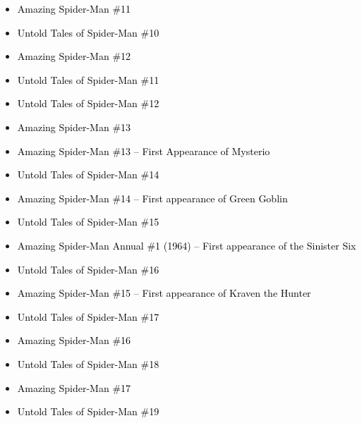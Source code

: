 \documentclass[12pt]{article}
\begin{document}
\begin{minipage}{\textwidth}
\begin{center}
    \begin{tcolorbox}[colback=white!95!gray, colframe=black, width=0.85\textwidth, boxrule=0.5mm, sharp corners=south]
    \begin{itemize}[left=0pt, label={$\square$}]
        \item \textcolor{black}{Amazing Spider-Man \#11}
        \item \textcolor{black}{Untold Tales of Spider-Man \#10}
        \item \textcolor{black}{Amazing Spider-Man \#12}
        \item \textcolor{black}{Untold Tales of Spider-Man \#11}
        \item \textcolor{black}{Untold Tales of Spider-Man \#12}
        \item \textcolor{black}{Amazing Spider-Man \#13}
        \item \textcolor{black}{Amazing Spider-Man \#13 – First Appearance of Mysterio}
        \item \textcolor{black}{Untold Tales of Spider-Man \#14}
        \item \textcolor{black}{Amazing Spider-Man \#14 – First appearance of Green Goblin}
        \item \textcolor{black}{Untold Tales of Spider-Man \#15}
        \item \textcolor{black}{Amazing Spider-Man Annual \#1 (1964) – First appearance of the Sinister Six}
        \item \textcolor{black}{Untold Tales of Spider-Man \#16}
        \item \textcolor{black}{Amazing Spider-Man \#15 – First appearance of Kraven the Hunter}
        \item \textcolor{black}{Untold Tales of Spider-Man \#17}
        \item \textcolor{black}{Amazing Spider-Man \#16}
        \item \textcolor{black}{Untold Tales of Spider-Man \#18}
        \item \textcolor{black}{Amazing Spider-Man \#17}
        \item \textcolor{black}{Untold Tales of Spider-Man \#19}
    \end{itemize}
    \end{tcolorbox}
\end{center}
\end{minipage}
\end{document}
